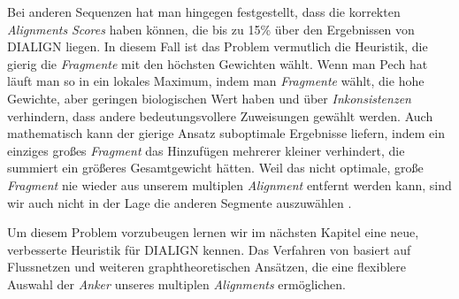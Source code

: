 Bei anderen Sequenzen hat man hingegen festgestellt, dass die korrekten \emph{Alignments} \emph{Scores} haben können, die bis zu 15\% über den Ergebnissen von DIALIGN liegen. In diesem Fall ist das Problem vermutlich die Heuristik, die gierig die \emph{Fragmente} mit den höchsten Gewichten wählt. Wenn man Pech hat läuft man so in ein lokales Maximum, indem man \emph{Fragmente} wählt, die hohe Gewichte, aber geringen biologischen Wert haben und über \emph{Inkonsistenzen} verhindern, dass andere bedeutungsvollere Zuweisungen gewählt werden. Auch mathematisch kann der gierige Ansatz suboptimale Ergebnisse liefern, indem ein einziges großes \emph{Fragment} das Hinzufügen mehrerer kleiner verhindert, die summiert ein größeres Gesamtgewicht hätten. Weil das nicht optimale, große \emph{Fragment} nie wieder aus unserem multiplen \emph{Alignment} entfernt werden kann, sind wir auch nicht in der Lage die anderen Segmente auszuwählen \citep{m99}. 

Um diesem Problem vorzubeugen lernen wir im nächsten Kapitel eine neue, verbesserte Heuristik für DIALIGN kennen. Das Verfahren von \cite{cpm10} basiert auf Flussnetzen und weiteren graphtheoretischen Ansätzen, die eine flexiblere Auswahl der \emph{Anker} unseres multiplen \emph{Alignments} ermöglichen.